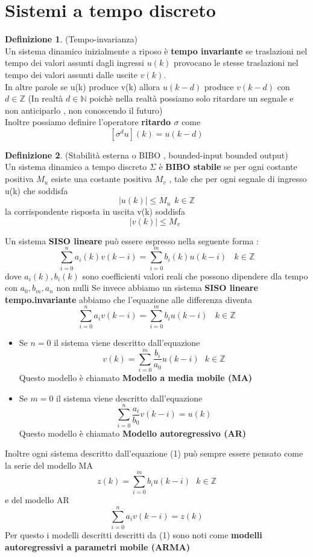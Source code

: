 \documentclass{article}
\theoremstyle{definition}
\newtheorem*{definizione}{Definizione}
\newcommand{\sisdiscr}{\sum_{i=0}^n a_iv(k-i)=\sum_{i=0}^m b_iu(k-i) \ \ \ \ k \in \mathbb{Z}}
\begin{document}
	
	
	
	
	
	
	
	
	
	
	
	\newpage
	\section{Sistemi a tempo discreto}
	\begin{definizione}(Tempo-invarianza)\\
		Un sistema dinamico inizialmente a riposo è \textbf{tempo invariante} se traslazioni nel tempo dei valori assunti dagli ingressi $u(k)$ provocano le stesse traslazioni nel tempo dei valori assunti dalle uscite $v(k)$.\\
		In altre parole se u(k) produce v(k) allora $u(k-d)$ produce $v(k-d)$ con $d \in \mathbb{Z}$ (In realtà $d \in \mathbb{N}$ poichè nella realtà possiamo solo ritardare un segnale e non anticiparlo , non conoscendo il futuro)\\
		Inoltre possiamo definire l'operatore \textbf{ritardo $\sigma$ } come 
		$$[\sigma^d u](k)=u(k-d)$$
			\end{definizione}
	\begin{definizione}(Stabilità esterna o BIBO , bounded-input bounded output)\\
		Un sistema dinamico a tempo discreto $\Sigma$ è \textbf{BIBO stabile }se per ogni costante positiva $M_u$ esiste una costante positiva $M_v$ , tale che per ogni segnale di ingresso u(k) che soddisfa 
		$$|u(k)|\leq M_u \ \  k \in \mathbb{Z}$$
		la corrispondente risposta in uscita v(k) soddisfa
		$$|v(k)|\leq M_v \ \  \textbf{} $$
	\end{definizione}
	Un sistema \textbf{SISO lineare} può essere espresso nella seguente forma : 
	$$\sum_{i=0}^n a_i(k)v(k-i)=\sum_{i=0}^m b_i(k)u(k-i) \ \ \ \ k \in \mathbb{Z}$$
	dove $a_i(k),b_i(k)$ sono coefficienti  valori reali che possono dipendere dla tempo con $a_0,b_m,a_n$ non nulli
	Se invece abbiamo un sistema \textbf{SISO lineare tempo.invariante} abbiamo che l'equazione alle differenza diventa 
	\begin{equation}
		\sisdiscr
	\end{equation}
	\begin{itemize}
		\item Se $n=0$ il sistema viene descritto dall'equazione 
		$$v(k)=\sum_{i=0}^{m}\frac{b_i}{a_0}u(k-i)  \ \ \ k \in \mathbb{Z}$$
		Questo modello è chiamato \textbf{Modello a media mobile (MA)}
		\item Se $m=0$ il sistema viene descritto dall'equazione
		$$\sum_{i=0}^{n}\frac{a_i}{b_0}v(k-i)=u(k)$$
		Questo modello è chiamato \textbf{Modello autoregressivo (AR)}
	\end{itemize}
	Inoltre ogni sistema descritto dall'equazione (1) può sempre essere pensato come la serie del modello MA 
	$$z(k)=\sum_{i=0}^{m}b_i u(k-i) \ \ \ k \in \mathbb{Z}$$
	e del modello AR
	$$\sum_{i=0}^{n}a_iv(k-i)=z(k)$$
	Per questo i modelli descritti descritti  da (1) sono noti come \textbf{modelli autoregressivi a parametri mobile (ARMA)}
\end{document}
